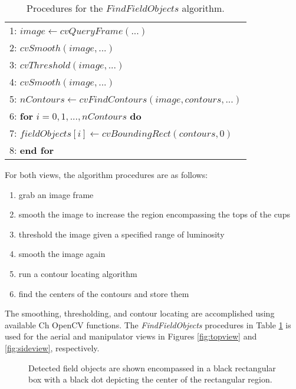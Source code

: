    \begin{table}
    \caption{Procedures for the $FindFieldObjects$ algorithm.}
    \label{tab:findfieldobjects}
    \begin{center}
    \begin{tabular}{|l|}
    \hline
    1: $image\gets cvQueryFrame(...)$ \\
    2: $cvSmooth(image,...)$ \\
    3: $cvThreshold(image,...)$ \\
    4: $cvSmooth(image,...)$ \\
    5: $nContours\gets cvFindContours(image,contours,...)$ \\
    6: \textbf{for} $i=0,1,...,nContours$ \textbf{do} \\
    7: $fieldObjects[i]\gets cvBoundingRect(contours,0)$ \\
    8: \textbf{end for}\\
    \hline
    \end{tabular}
    \end{center}
    \end{table}

    For both views, the algorithm procedures are as follows:
    \begin{enumerate}
      \item grab an image frame
      \item smooth the image to increase the region encompassing
         the tops of the cups
      \item threshold the image given a specified range of 
         luminosity
      \item smooth the image again
      \item run a contour locating algorithm 
      \item find the centers of the contours and store them
    \end{enumerate}
    The smoothing, thresholding, and contour locating are accomplished using 
      available Ch OpenCV functions.
    The \textit{FindFieldObjects} procedures in Table \ref{tab:findfieldobjects}
      is used for the aerial and manipulator views in Figures \ref{fig:topview}
      and \ref{fig:sideview}, respectively.

    \begin{figure}%
    \begin{center}
    \caption{Detected field objects are shown encompassed in a black 
             rectangular box with a black dot depicting the center of the 
             rectangular region.}
    \label{fig:contours}
    \end{center}
    \end{figure}

